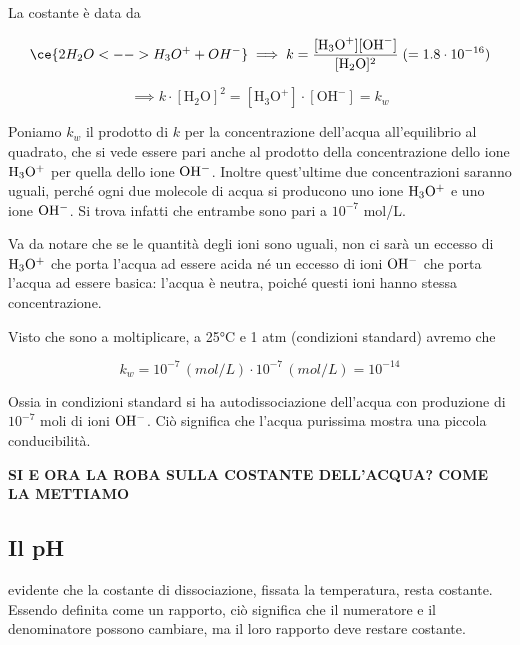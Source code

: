 La costante è data da

$$\ce{2 H_2O <--> H_3O^+ + OH^-}
\implies
k= \frac{[\text{H}_3\text{O}^+] [\text{OH}^-]}{[\text{H}_2\text{O}]^2} \; (=1.8 \cdot 10^{-16})$$

$$\implies k \cdot [\text{H}_2\text{O}]^2 = [\text{H}_3\text{O}^+] \cdot [\text{OH}^-] = k_w$$

Poniamo $k_w$ il prodotto di $k$ per la concentrazione dell'acqua all'equilibrio al quadrato, che si vede essere pari anche al prodotto della concentrazione dello ione $\rm H_3O^+$ per quella dello ione $\rm OH^-$. Inoltre quest'ultime due concentrazioni saranno uguali, perché ogni due molecole di acqua si producono uno ione $\rm H_3O^+$ e uno ione $\rm OH^-$. Si trova infatti che entrambe sono pari a $10^{-7}$ mol/L.

Va da notare che se le quantità degli ioni sono uguali, non ci sarà un eccesso di $\rm H_3O^+$ che porta l'acqua ad essere acida né un eccesso di ioni $\rm OH^-$ che porta l'acqua ad essere basica: l'acqua è neutra, poiché questi ioni hanno stessa concentrazione.

Visto che sono a moltiplicare, a 25°C e 1 atm (condizioni standard) avremo che

$$k_w = 10^{-7} \, (mol/L) \cdot 10^{-7} \, (mol/L) = 10^{-14}$$

Ossia in condizioni standard si ha autodissociazione dell'acqua con produzione di $10^{-7}$ moli di ioni $\rm OH^-$. Ciò significa che l'acqua purissima mostra una piccola conducibilità.

\textbf{SI E ORA LA ROBA SULLA COSTANTE DELL'ACQUA? COME LA METTIAMO}



\subsection{Il pH}
\E evidente che la costante di dissociazione, fissata la temperatura, resta costante. Essendo definita come un rapporto, ciò significa che il numeratore e il denominatore possono cambiare, ma il loro rapporto deve restare costante.

